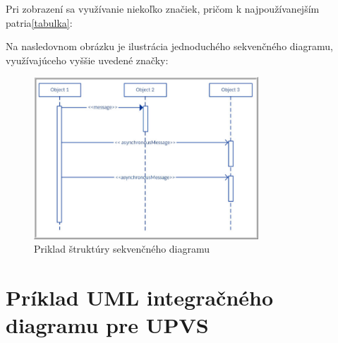 \documentclass[10pt,twoside,slovak,a4paper]{article}
\begin{document}
Pri zobrazení sa využívanie niekoľko značiek, pričom k najpoužívanejším patria\ref{tabulka}:
\begin{table}[h!]
\centering
\caption{Vysvetlenie daných značiek\cite{TabJa}}
\label{tabulka}
\end {table}


Na nasledovnom obrázku je ilustrácia jednoduchého sekvenčného diagramu, využívajúceho vyššie uvedené značky\cite{SDT}:
\begin{figure}[h]
\centering
\includegraphics[width=0.75\textwidth]{Images/Obr2.jpg}
\caption{Priklad štruktúry sekvenčného diagramu\cite{SDT}}
\label{Strukt}
\end{figure}



\section{Príklad UML integračného diagramu pre UPVS} \label{4sek}
\end{document}

